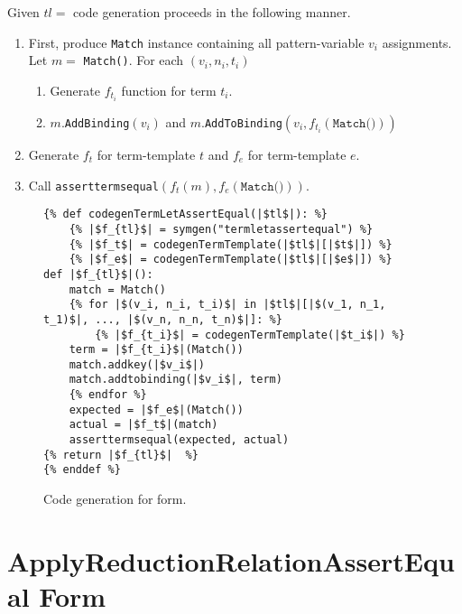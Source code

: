 Given $tl=$ \TermLetAssertEqual code generation proceeds in the following manner.
\begin{enumerate}
	\item First, produce \texttt{Match} instance containing all pattern-variable $v_i$ assignments. Let $m=$ \texttt{Match()}. For each $(v_i, n_i, t_i)$
	\begin{enumerate}
	\item Generate $f_{t_i}$ function for term $t_i$.
	\item $m$.\texttt{AddBinding}$(v_i)$ and $m$.\texttt{AddToBinding}$(v_i, f_{t_i}(\texttt{Match()}))$
	\end{enumerate}
\item Generate $f_t$ for term-template $t$ and $f_e$ for term-template $e$.
\item Call \texttt{asserttermsequal}$(f_t(m), f_e(\texttt{Match()}))$.
\end{enumerate}

\begin{figure}[h]
\begin{verbatim}
{% def codegenTermLetAssertEqual(|$tl$|): %}
	{% |$f_{tl}$| = symgen("termletassertequal") %}
	{% |$f_t$| = codegenTermTemplate(|$tl$|[|$t$|]) %}
	{% |$f_e$| = codegenTermTemplate(|$tl$|[|$e$|]) %}
def |$f_{tl}$|():
	match = Match()
	{% for |$(v_i, n_i, t_i)$| in |$tl$|[|$(v_1, n_1, t_1)$|, ..., |$(v_n, n_n, t_n)$|]: %}
		{% |$f_{t_i}$| = codegenTermTemplate(|$t_i$|) %}
	term = |$f_{t_i}$|(Match())
	match.addkey(|$v_i$|)
	match.addtobinding(|$v_i$|, term)
	{% endfor %}
	expected = |$f_e$|(Match())
	actual = |$f_t$|(match)
	asserttermsequal(expected, actual)
{% return |$f_{tl}$|  %}
{% enddef %}
\end{verbatim}
\caption{Code generation for \TermLetAssertEqualNoArgs \space form.}
\label{codegen-termlet}
\end{figure}


\section{ApplyReductionRelationAssertEqual Form}

